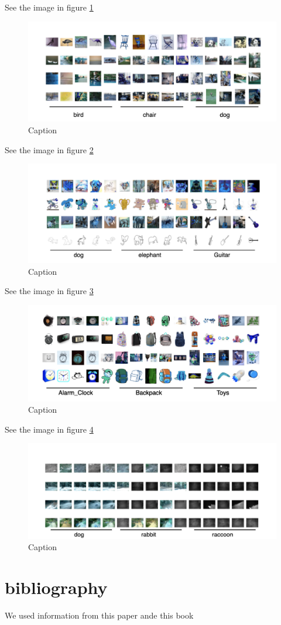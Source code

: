 \documentclass{article}
\begin{document}
See the image in figure \ref{fig:my_label6}
\begin{figure}
    \centering
    \includegraphics[width=0.95\linewidth]{figure6.jpg}
    \caption{Caption}
    \label{fig:my_label6}
\end{figure}




See the image in figure \ref{fig:my_label7}
\begin{figure}
    \centering
    \includegraphics[width=0.95\linewidth]{figure7.jpg}
    \caption{Caption}
    \label{fig:my_label7}
\end{figure}



See the image in figure \ref{fig:my_label8}
\begin{figure}
    \centering
    \includegraphics[width=0.95\linewidth]{figure8.jpg}
    \caption{Caption}
    \label{fig:my_label8}
\end{figure}

See the image in figure \ref{fig:my_label9}
\begin{figure}
    \centering
    \includegraphics[width=0.95\linewidth]{figure9.jpg}
    \caption{Caption}
    \label{fig:my_label9}
\end{figure}
\section{bibliography}
We used information from this paper \cite{f1} ande this book \cite{giulianotti2009globalization}
\printbibliography
\end{document}
